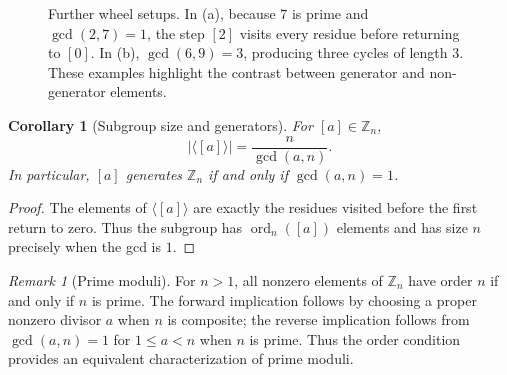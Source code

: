\documentclass[11pt,a4paper]{article}
\newtheorem{corollary}[theorem]{Corollary}
\theoremstyle{definition}
\theoremstyle{remark}
\newtheorem{remark}[theorem]{Remark}
\DeclareMathOperator{\ord}{ord}
\begin{document}
\begin{figure}[ht]
\centering
\begin{minipage}[t]{0.47\textwidth}
\centering
{}
\caption*{(a) $\mathbb Z_7$, step size $2$}
\end{minipage}\hfill
\begin{minipage}[t]{0.47\textwidth}
\centering
{}
\caption*{(b) $\mathbb Z_9$, step size $6$}
\end{minipage}
\caption{Further wheel setups. In (a), because $7$ is prime and $\gcd(2,7)=1$, the step $[2]$ visits every residue before returning to $[0]$. In (b), $\gcd(6,9)=3$, producing three cycles of length $3$. These examples highlight the contrast between generator and non-generator elements.}
\label{fig:morewheels}
\end{figure}

\begin{corollary}[Subgroup size and generators]\label{cor:generators}
For $[a]\in\mathbb Z_n$,
\[
|\langle[a]\rangle|=\frac{n}{\gcd(a,n)}.
\]
In particular, $[a]$ generates $\mathbb Z_n$ if and only if $\gcd(a,n)=1$.
\end{corollary}
\begin{proof}
The elements of $\langle[a]\rangle$ are exactly the residues visited before the first return to zero. Thus the subgroup has $\ord_n([a])$ elements and has size $n$ precisely when the gcd is $1$.
\end{proof}

\begin{remark}[Prime moduli]
For $n>1$, all nonzero elements of $\mathbb Z_n$ have order $n$ if and only if $n$ is prime. The forward implication follows by choosing a proper nonzero divisor $a$ when $n$ is composite; the reverse implication follows from $\gcd(a,n)=1$ for $1\le a<n$ when $n$ is prime. Thus the order condition provides an equivalent characterization of prime moduli.
\end{remark}
\end{document}
